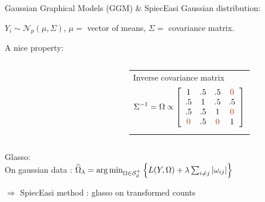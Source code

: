 \documentclass{beamer}
\newcommand{\edgeunit}{1.5}
\newcommand{\emphase}[1]{\textcolor{Complement}{#1}}
\newcommand{\Ncal}{\mathcal{N}}
\begin{document}
\begin{frame}{Gaussian Graphical Models (GGM) \& SpiecEasi}
   \emphase{Gaussian distribution:}\\
 \begin{center}
	$  Y_i \sim \Ncal_p(\mu, \Sigma) $, $\mu =$ vector of means, $\Sigma =$ covariance matrix.
\end{center}
  
 
  
   \bigskip %
  \emphase{A nice property:} ~ \\

  \begin{columns}
  \begin{column}{0.05\textwidth}
	
\end{column}
  \begin{column}{0.4\textwidth}
    \end{column}
    \begin{column}{12cm}
    \begin{tabular}{p{}}
	 Inverse covariance matrix
	 $$
	 \Sigma^{-1} = \Omega \propto \left[ \begin{array}{cccc}
	   1 & .5 & .5 & \emphase{0} \\
	   .5 & 1 & .5 & .5 \\
	   .5 & .5 & 1 & \emphase{0} \\
	   \emphase{0} & .5& \emphase{0}  & 1
	   \end{array} \right] 
	 $$
    \end{tabular} 
   
  \end{column}
  \end{columns}
  \pause
 \emphase{Glasso:}\\\bigskip
 On gaussian data : $\widehat{\Omega}_\lambda = \arg\min_{\Omega \in \mathcal{S}_d^+}\left\{ L(Y,\Omega)+\lambda \sum_{i\neq j} |\omega_{ij}| \right\} \hspace{0.5cm} $\\
 \begin{center}
	$\Rightarrow$ {\color{Framableulight}SpiecEasi method \cite{kurtz}}: glasso on transformed counts
\end{center}


\end{frame}
\end{document}
